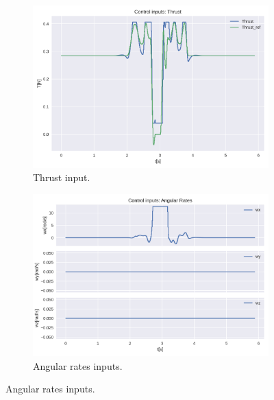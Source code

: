 \documentclass{thesisreport}
\begin{document}
\begin{figure}[H]
\medskip
	\begin{subfigure}{0.45\textwidth}
		\includegraphics[width=\linewidth]{Images/acados_simulations/flip_trajectory/3D_quadrotor/thrustInput.png}
		\caption{Thrust input.} \label{fig:3D_flip_sim_thrust_input}
	\end{subfigure}\hspace*{\fill}
	\begin{subfigure}{0.45\textwidth}
		\includegraphics[width=\linewidth]{Images/acados_simulations/flip_trajectory/3D_quadrotor/angulareRatesInputs.png}
		\caption{Angular rates inputs.} \label{fig:3D_flip_sim_rates_input}
	\end{subfigure}
	

\end{figure}
\end{document}
